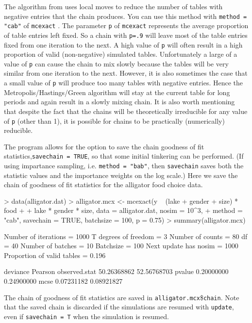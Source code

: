 \documentclass[a4paper]{article}
\newcommand{\mcexact}{\texttt{mcexact} }
\begin{document}
The algorithm from \cite{caffo:booth:2000} uses local moves to reduce
the number of tables with negative entries that the chain produces.
You can use this method with \texttt{method = "cab"} of \mcexact. The
parameter \texttt{p} of \mcexact represents the average proportion of table
entries left fixed. So a chain with \texttt{p=.9} will leave most of
the table entries fixed from one iteration to the next. A high value
of \texttt{p} will often result in a high proportion of valid
(non-negative) simulated tables. Unfortunately a large of a value of
\texttt{p} can cause the chain to mix slowly because the tables will
be very similar from one iteration to the next. However, it is also
sometimes the case that a small value of \texttt{p} will produce too
many tables with negative entries. Hence the Metropolis/Hastings/Green
algorithm will stay at the current table for long periods and again
result in a slowly mixing chain.  It is also worth mentioning that
despite the fact that the chains will be theoretically irreducible for
any value of \texttt{p} (other than 1), it is possible for chains to
be practically (numerically) reducible. 

The program allows for the option to save the chain goodness of fit
statistics,\texttt{savechain = TRUE}, so that some initial tinkering
can be performed.  (If using impartance sampling, i.e. \texttt{method =
"bab"}, then \texttt{savechain} saves both the statistic values and
the importance weights on the log scale.) Here we save the chain of goodness
of fit statistics for the alligator food choice data.
\begin{Schunk}
\begin{Sinput}
> data(alligator.dat)
> alligator.mcx <- mcexact(y ~ (lake + gender + size) * food + 
+     lake * gender * size, data = alligator.dat, nosim = 10^3, 
+     method = "cab", savechain = TRUE, batchsize = 100, p = 0.75)
> summary(alligator.mcx)
\end{Sinput}
\begin{Soutput}
Number of iterations       =  1000 
T degrees of freedom       =  3 
Number of counts           =  80 
df                         =  40 
Number of batches          =  10 
Batchsize                  =  100 
Next update has nosim      =  1000 
Proportion of valid tables =  0.196 

                 deviance     Pearson
observed.stat 50.26368862 52.56768703
pvalue         0.20000000  0.24900000
mcse           0.07231182  0.08921827
\end{Soutput}
\end{Schunk}
The chain of goodness of fit statistics are saved in
\texttt{alligator.mcx}\$\texttt{chain}. Note that the saved chain is
discarded if the simulations are resumed with \texttt{update}, even if
\texttt{savechain = T} when the simulation is resumed.
\end{document}
